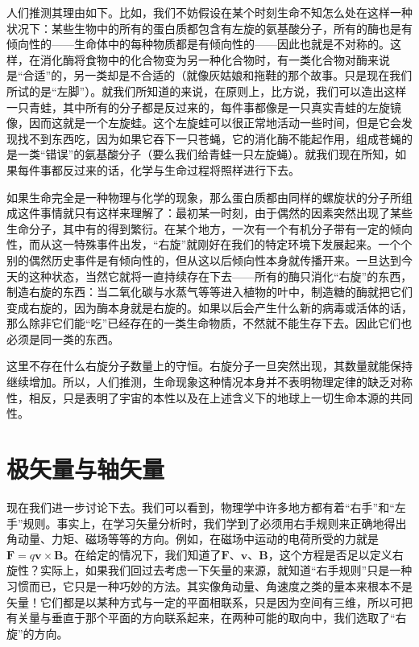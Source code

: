 人们推测其理由如下。比如，我们不妨假设在某个时刻生命不知怎么处在这样一种状况下：某些生物中的所有的蛋白质都包含有左旋的氨基酸分子，所有的酶也是有倾向性的——生命体中的每种物质都是有倾向性的——因此也就是不对称的。这样，在消化酶将食物中的化合物变为另一种化合物时，有一类化合物对酶来说是“合适”的，另一类却是不合适的（就像灰姑娘和拖鞋的那个故事。只是现在我们所试的是“左脚”）。就我们所知道的来说，在原则上，比方说，我们可以造出这样一只青蛙，其中所有的分子都是反过来的，每件事都像是一只真实青蛙的左旋镜像，因而这就是一个左旋蛙。这个左旋蛙可以很正常地活动一些时间，但是它会发现找不到东西吃，因为如果它吞下一只苍蝇，它的消化酶不能起作用，组成苍蝇的是一类“错误”的氨基酸分子（要么我们给青蛙一只左旋蝇）。就我们现在所知，如果每件事都反过来的话，化学与生命过程将照样进行下去。

如果生命完全是一种物理与化学的现象，那么蛋白质都由同样的螺旋状的分子所组成这件事情就只有这样来理解了：最初某一时刻，由于偶然的因素突然出现了某些生命分子，其中有的得到繁衍。在某个地方，一次有一个有机分子带有一定的倾向性，而从这一特殊事件出发，“右旋”就刚好在我们的特定环境下发展起来。一个个别的偶然历史事件是有倾向性的，但从这以后倾向性本身就传播开来。一旦达到今天的这种状态，当然它就将一直持续存在下去——所有的酶只消化“右旋”的东西，制造右旋的东西：当二氧化碳与水蒸气等等进入植物的叶中，制造糖的酶就把它们变成右旋的，因为酶本身就是右旋的。如果以后会产生什么新的病毒或活体的话，那么除非它们能“吃”已经存在的一类生命物质，不然就不能生存下去。因此它们也必须是同一类的东西。

这里不存在什么右旋分子数量上的守恒。右旋分子一旦突然出现，其数量就能保持继续增加。所以，人们推测，生命现象这种情况本身并不表明物理定律的缺乏对称性，相反，只是表明了宇宙的本性以及在上述含义下的地球上一切生命本源的共同性。

\section{极矢量与轴矢量}

现在我们进一步讨论下去。我们可以看到，物理学中许多地方都有着“右手”和“左手”规则。事实上，在学习矢量分析时，我们学到了必须用右手规则来正确地得出角动量、力矩、磁场等等的方向。例如，在磁场中运动的电荷所受的力就是$\boldsymbol{F} = q\boldsymbol{v}\times\boldsymbol{B}$。在给定的情况下，我们知道了$\boldsymbol{F}$、$\boldsymbol{v}$、$\boldsymbol{B}$，这个方程是否足以定义右旋性？实际上，如果我们回过去考虑一下矢量的来源，就知道“右手规则”只是一种习惯而已，它只是一种巧妙的方法。其实像角动量、角速度之类的量本来根本不是矢量！它们都是以某种方式与一定的平面相联系，只是因为空间有三维，所以可把有关量与垂直于那个平面的方向联系起来，在两种可能的取向中，我们选取了“右旋”的方向。

